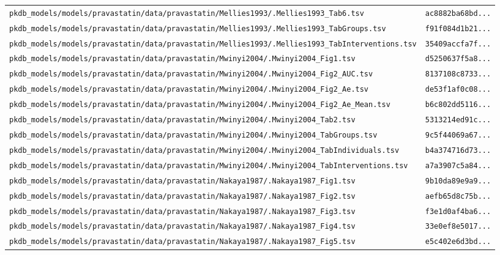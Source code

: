\documentclass{article}
\begin{document}
\begin{longtable}{ll}
\texttt{pkdb\_models/models/pravastatin/data/pravastatin/Mellies1993/.Mellies1993\_Tab6.tsv} & \texttt{ac8882ba68bd...} \\
\texttt{pkdb\_models/models/pravastatin/data/pravastatin/Mellies1993/.Mellies1993\_TabGroups.tsv} & \texttt{f91f084d1b21...} \\
\texttt{pkdb\_models/models/pravastatin/data/pravastatin/Mellies1993/.Mellies1993\_TabInterventions.tsv} & \texttt{35409accfa7f...} \\
\texttt{pkdb\_models/models/pravastatin/data/pravastatin/Mwinyi2004/.Mwinyi2004\_Fig1.tsv} & \texttt{d5250637f5a8...} \\
\texttt{pkdb\_models/models/pravastatin/data/pravastatin/Mwinyi2004/.Mwinyi2004\_Fig2\_AUC.tsv} & \texttt{8137108c8733...} \\
\texttt{pkdb\_models/models/pravastatin/data/pravastatin/Mwinyi2004/.Mwinyi2004\_Fig2\_Ae.tsv} & \texttt{de53f1af0c08...} \\
\texttt{pkdb\_models/models/pravastatin/data/pravastatin/Mwinyi2004/.Mwinyi2004\_Fig2\_Ae\_Mean.tsv} & \texttt{b6c802dd5116...} \\
\texttt{pkdb\_models/models/pravastatin/data/pravastatin/Mwinyi2004/.Mwinyi2004\_Tab2.tsv} & \texttt{5313214ed91c...} \\
\texttt{pkdb\_models/models/pravastatin/data/pravastatin/Mwinyi2004/.Mwinyi2004\_TabGroups.tsv} & \texttt{9c5f44069a67...} \\
\texttt{pkdb\_models/models/pravastatin/data/pravastatin/Mwinyi2004/.Mwinyi2004\_TabIndividuals.tsv} & \texttt{b4a374716d73...} \\
\texttt{pkdb\_models/models/pravastatin/data/pravastatin/Mwinyi2004/.Mwinyi2004\_TabInterventions.tsv} & \texttt{a7a3907c5a84...} \\
\texttt{pkdb\_models/models/pravastatin/data/pravastatin/Nakaya1987/.Nakaya1987\_Fig1.tsv} & \texttt{9b10da89e9a9...} \\
\texttt{pkdb\_models/models/pravastatin/data/pravastatin/Nakaya1987/.Nakaya1987\_Fig2.tsv} & \texttt{aefb65d8c75b...} \\
\texttt{pkdb\_models/models/pravastatin/data/pravastatin/Nakaya1987/.Nakaya1987\_Fig3.tsv} & \texttt{f3e1d0af4ba6...} \\
\texttt{pkdb\_models/models/pravastatin/data/pravastatin/Nakaya1987/.Nakaya1987\_Fig4.tsv} & \texttt{33e0ef8e5017...} \\
\texttt{pkdb\_models/models/pravastatin/data/pravastatin/Nakaya1987/.Nakaya1987\_Fig5.tsv} & \texttt{e5c402e6d3bd...} \\

\end{longtable}
\end{document}
